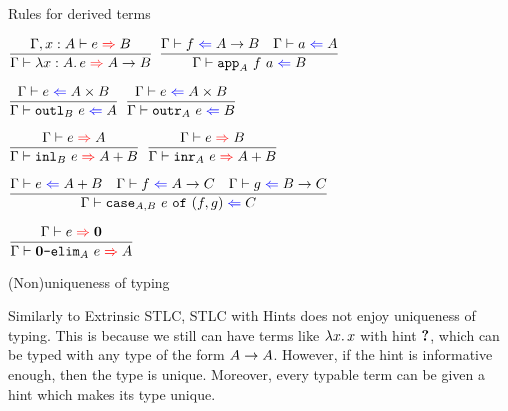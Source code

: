 \documentclass{beamer}
\begin{document}
\begin{frame}{Rules for derived terms}

\begin{center}
  $\infrule{\infer[\extend{\Gamma}{x}{A}]{e}{B}}{\infer{\fun{x}[A]{e}}{\Fun{A}{B}}}$ \quad
  $\infrule{\check{f}{\Fun{A}{B}} \quad \check{a}{A}}{\check{\app[A]{f}{a}}{B}}$

  \vspace{2em}

  $\infrule{\check{e}{\Prod{A}{B}}}{\check{\outl[B]{e}}{A}}$ \enspace
  $\infrule{\check{e}{\Prod{A}{B}}}{\check{\outr[A]{e}}{B}}$

  \vspace{2em}

  $\infrule{\infer{e}{A}}{\infer{\inl[B]{e}}{\Sum{A}{B}}}$ \quad
  $\infrule{\infer{e}{B}}{\infer{\inr[A]{e}}{\Sum{A}{B}}}$

  \vspace{2em}

  $\infrule{\check{e}{\Sum{A}{B}} \quad \check{f}{\Fun{A}{C}} \quad \check{g}{\Fun{B}{C}}}{\check{\caseannot{A}{B}{e}{f}{g}}{C}}$

  \vspace{2em}

  $\infrule{\infer{e}{\Empty}}{\infer{\emptyelim[A]{e}}{A}}$
\end{center}

\end{frame}

\begin{frame}{(Non)uniqueness of typing}

Similarly to Extrinsic STLC, STLC with Hints does not enjoy uniqueness of typing. This is because we still can have terms like $\fun{x}{x}$ with hint $\textbf{?}$, which can be typed with any type of the form $A \to A$. However, if the hint is informative enough, then the type is unique. Moreover, every typable term can be given a hint which makes its type unique.

\end{frame}
\end{document}
